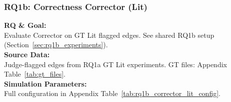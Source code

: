 \subsubsection{RQ1b: Correctness Corrector (Lit)}
\label{sec:rq1b_corrector_lit}

\textbf{RQ \& Goal:}\\
Evaluate Corrector on GT Lit flagged edges. See shared RQ1b setup (Section~\ref{sec:rq1b_experiments}).\\
\textbf{Source Data:}\\
Judge-flagged edges from RQ1a GT Lit experiments. GT files: Appendix Table~\ref{tab:gt_files}.\\
\textbf{Simulation Parameters:}\\
Full configuration in Appendix Table~\ref{tab:rq1b_corrector_lit_config}.\\

